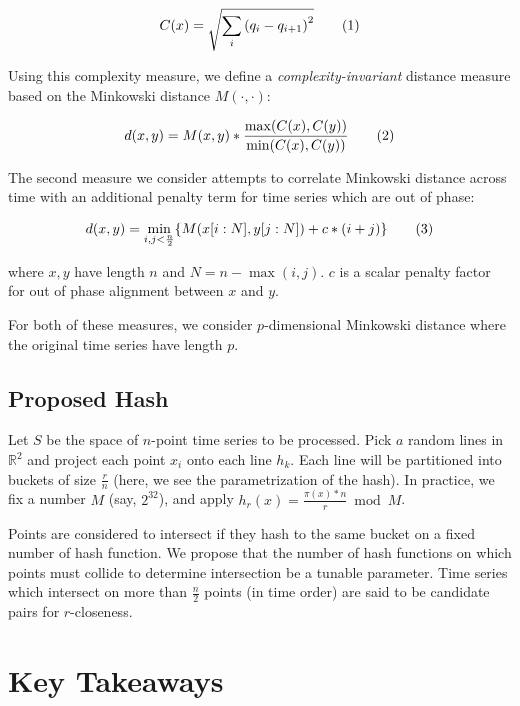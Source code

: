 \documentclass[a4paper]{article}
\newcommand\numberthis{\addtocounter{equation}{1}\tag{\theequation}}
\begin{document}
\begin{align*}
    C(x) = \sqrt{\sum\limits_i {(q_i - q_{i+1})}^2} \numberthis
\end{align*}

Using this complexity measure, we define a \textit{complexity-invariant} distance measure based on the Minkowski distance $M(\cdot,\cdot)$:

\begin{align*}
    d(x,y) = M(x,y) * \frac{\max(C(x),C(y))}{\min(C(x),C(y))} \numberthis
\end{align*}

The second measure we consider attempts to correlate Minkowski distance across time with an additional penalty term for time series which are out of phase:

\begin{align*}
    d(x,y) = \min\limits_{i,j<\frac{n}{2}} \{ M(x[i:N],y[j:N]) + c*(i+j) \} \numberthis \\
\end{align*}

where $x,y$ have length $n$ and $N = n - \max(i,j)$.
$c$ is a scalar penalty factor for out of phase alignment between $x$ and $y$.

For both of these measures, we consider $p$-dimensional Minkowski distance where the original time series have length $p$.

\subsection{Proposed Hash}

Let $S$ be the space of $n$-point time series to be processed.
Pick $a$ random lines in $\mathbb{R}^2$ and project each point $x_i$ onto each line $h_k$.
Each line will be partitioned into buckets of size $\frac{r}{n}$ (here, we see the parametrization of the hash).
In practice, we fix a number $M$ (say, $2^{32}$), and apply $h_r(x) = \frac{\pi(x)*n}{r} \bmod M$. 

Points are considered to intersect if they hash to the same bucket on a fixed number of hash function.
We propose that the number of hash functions on which points must collide to determine intersection be a tunable parameter.
Time series which intersect on more than $\frac{n}{2}$ points (in time order) are said to be candidate pairs for $r$-closeness.

\section{Key Takeaways}
\end{document}
